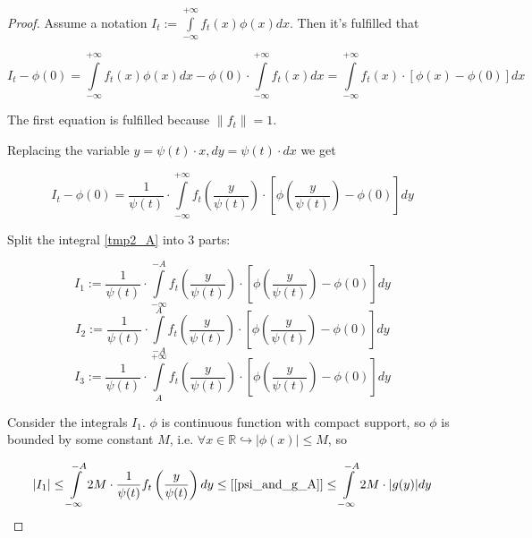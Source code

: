 \documentclass{article}
\begin{document}
    \begin{proof}
        Assume a notation $I_t := \int\limits_{-\infty}^{+\infty} f_t(x) \phi(x) dx$. Then it's fulfilled that

        \begin{equation*}
            I_t - \phi(0) = \int\limits_{-\infty}^{+\infty} f_t(x) \phi(x) dx - \phi(0) \cdot \int\limits_{-\infty}^{+\infty} f_t(x) dx = \int\limits_{-\infty}^{+\infty} f_t(x) \cdot [\phi(x) - \phi(0)] dx
        \end{equation*}

        The first equation is fulfilled because $\|f_t\| = 1$.
        
        Replacing the variable $y = \psi(t) \cdot x, dy = \psi(t) \cdot dx$ we get

        \begin{equation} \label{tmp2_A}
            I_t - \phi(0) = \dfrac{1}{\psi(t)} \cdot \int\limits_{-\infty}^{+\infty} f_t\left(\frac{y}{\psi(t)}\right) \cdot \left[\phi\left(\frac{y}{\psi(t)}\right) - \phi(0)\right] dy
        \end{equation}

        Split the integral \eqref{tmp2_A} into 3 parts:
        
        \begin{equation*}
            I_1 := \dfrac{1}{\psi(t)} \cdot \int\limits_{-\infty}^{-A} f_t\left(\frac{y}{\psi(t)}\right) \cdot \left[\phi\left(\frac{y}{\psi(t)}\right) - \phi(0)\right] dy
        \end{equation*}
        \begin{equation*}
            I_2 := \dfrac{1}{\psi(t)} \cdot \int\limits_{-A}^{A} f_t\left(\frac{y}{\psi(t)}\right) \cdot \left[\phi\left(\frac{y}{\psi(t)}\right) - \phi(0)\right] dy
        \end{equation*}
        \begin{equation*}
            I_3 := \dfrac{1}{\psi(t)} \cdot \int\limits_{A}^{+\infty} f_t\left(\frac{y}{\psi(t)}\right) \cdot \left[\phi\left(\frac{y}{\psi(t)}\right) - \phi(0)\right] dy
        \end{equation*}

        Consider the integrals $I_1$. $\phi$ is continuous function with compact support, so $\phi$ is bounded by some constant $M$, i.e. $\forall x \in \mathbb{R} \hookrightarrow |\phi(x)| \leq M$, so 

        \begin{equation*}
            \left|I_1\right| \leq \int\limits_{-\infty}^{-A} 2 M \cdot \dfrac{1}{\psi(t)} f_t\left(\frac{y}{\psi(t)}\right) dy \leq \left[\eqref{psi_and_g_A}\right]
            \leq \int\limits_{-\infty}^{-A} 2 M \cdot |g(y)| dy 
        \end{equation*}


\end{proof}
\end{document}
